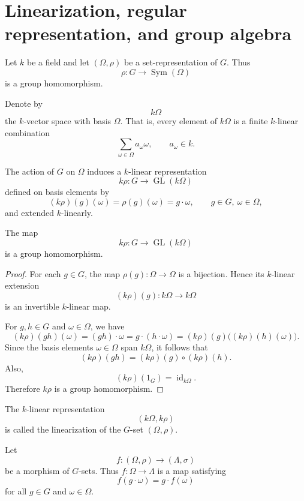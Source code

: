 \section{Linearization, regular representation, and group algebra}

Let \(k\) be a field and let \((\Omega,\rho)\) be a set-representation of \(G\). Thus
\[
    \rho:G\longrightarrow \operatorname{Sym}(\Omega)
\]
is a group homomorphism.

Denote by
\[
    k\Omega
\]
the \(k\)-vector space with basis \(\Omega\). That is, every element of \(k\Omega\) is a
finite \(k\)-linear combination
\[
    \sum_{\omega\in \Omega} a_\omega \omega,
    \qquad a_\omega\in k.
\]

The action of \(G\) on \(\Omega\) induces a \(k\)-linear representation
\[
    k\rho:G\longrightarrow \operatorname{GL}(k\Omega)
\]
defined on basis elements by
\[
    (k\rho)(g)(\omega)=\rho(g)(\omega)=g\cdot \omega,
    \qquad g\in G,\ \omega\in \Omega,
\]
and extended \(k\)-linearly.

\begin{lemma}
    The map
    \[
        k\rho:G\longrightarrow \operatorname{GL}(k\Omega)
    \]
    is a group homomorphism.
\end{lemma}

\begin{proof}
    For each \(g\in G\), the map \(\rho(g):\Omega\to\Omega\) is a bijection. Hence
    its \(k\)-linear extension
    \[
        (k\rho)(g):k\Omega\to k\Omega
    \]
    is an invertible \(k\)-linear map.

    For \(g,h\in G\) and \(\omega\in \Omega\), we have
    \[
        (k\rho)(gh)(\omega)
        =
        (gh)\cdot \omega
        =
        g\cdot(h\cdot \omega)
        =
        (k\rho)(g)\bigl((k\rho)(h)(\omega)\bigr).
    \]
    Since the basis elements \(\omega\in\Omega\) span \(k\Omega\), it follows that
    \[
        (k\rho)(gh)=(k\rho)(g)\circ (k\rho)(h).
    \]
    Also,
    \[
        (k\rho)(1_G)=\operatorname{id}_{k\Omega}.
    \]
    Therefore \(k\rho\) is a group homomorphism.
\end{proof}

\begin{definition}
    The \(k\)-linear representation
    \[
        (k\Omega,k\rho)
    \]
    is called the linearization of the \(G\)-set \((\Omega,\rho)\).
\end{definition}

Let
\[
    f:(\Omega,\rho)\longrightarrow (\Lambda,\sigma)
\]
be a morphism of \(G\)-sets. Thus \(f:\Omega\to \Lambda\) is a map satisfying
\[
    f(g\cdot \omega)=g\cdot f(\omega)
\]
for all \(g\in G\) and \(\omega\in\Omega\).

